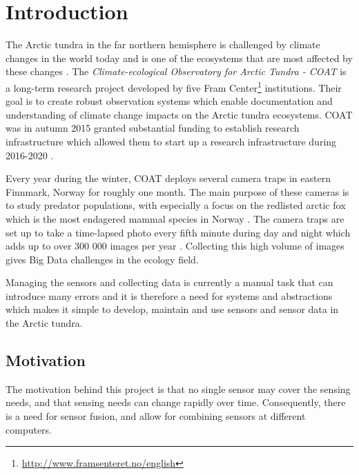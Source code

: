 \documentclass[USenglish]{uit-thesis}
\begin{document}
\mainmatter

\chapter{Introduction}
The Arctic tundra in the far northern hemisphere is challenged by climate changes in the world today and is one of the ecosystems that are most affected by these changes \cite{coat2016}. The \textit{Climate-ecological Observatory for Arctic Tundra - COAT} is a long-term research project developed by five Fram Center\footnote{\url{http://www.framsenteret.no/english}} institutions. Their goal is to create robust observation systems which enable documentation and understanding of climate change impacts on the Arctic tundra ecosystems. COAT was in autumn 2015 granted substantial funding to establish research infrastructure which allowed them to start up a research infrastructure during 2016-2020 \cite{coat2016}. 

Every year during the winter, COAT deploys several camera traps in eastern Finnmark, Norway for roughly one month. The main purpose of these cameras is to study predator populations, with especially a focus on the redlisted arctic fox which is the most endagered mammal species in Norway  \cite{coatplan2016}. 
The camera traps are set up to take a time-lapsed photo every fifth minute during day and night which adds up to over 300 000 images per year \cite{methodseco}. Collecting this high volume of images gives Big Data challenges in the ecology field.

Managing the sensors and collecting data is currently a manual task that can introduce many errors and it is therefore a need for systems and abstractions which makes it simple to develop, maintain and use sensors and sensor data in the Arctic tundra. 


\section{Motivation}

The motivation  behind this project is that no single sensor may cover the sensing needs, and that sensing needs can change rapidly over time. Consequently, there is a need for sensor fusion, and allow for combining sensors at different computers.
\end{document}
